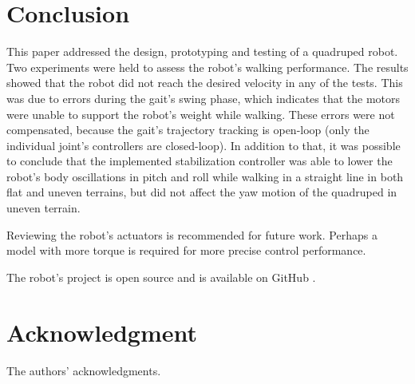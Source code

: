 \documentclass[conference]{IEEEtran}
\begin{document}

\section{Conclusion} \label{conclusion}

This paper addressed the design, prototyping and testing of a quadruped robot. Two experiments were held to assess the robot's walking performance. The results showed that the robot did not reach the desired velocity in any of the tests. This was due to errors during the gait's swing phase, which indicates that the motors were unable to support the robot's weight while walking. These errors were not compensated, because the gait's trajectory tracking is open-loop (only the individual joint's controllers are closed-loop). In addition to that, it was possible to conclude that the implemented stabilization controller was able to lower the robot's body oscillations in pitch and roll while walking in a straight line in both flat and uneven terrains, but did not affect the yaw motion of the quadruped in uneven terrain.

Reviewing the robot's actuators is recommended for future work. Perhaps a model with more torque is required for more precise control performance.

The robot's project is open source and is available on GitHub \cite{CaramelRepo}.

\section*{Acknowledgment}

The authors' acknowledgments. %


\end{document}

